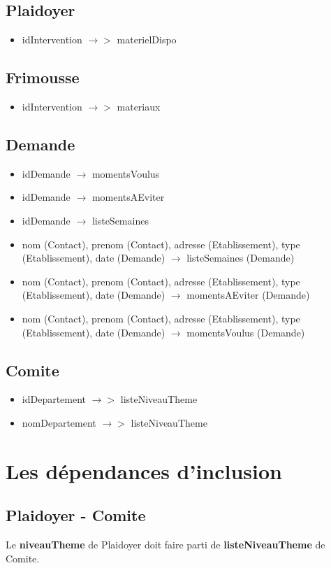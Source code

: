 \documentclass[asi, sansVersion]{picInsa}
\begin{document}
\subsection*{Plaidoyer}
\begin{itemize}
\item[]	idIntervention $\rightarrow >$ materielDispo
\end{itemize}

\subsection*{Frimousse}
\begin{itemize}
\item[]	idIntervention $\rightarrow >$ materiaux
\end{itemize}

\subsection*{Demande}
\begin{itemize}
\item[] idDemande $\rightarrow$ momentsVoulus
\item[] idDemande $\rightarrow$ momentsAEviter
\item[] idDemande $\rightarrow$ listeSemaines
\item[] nom (Contact), prenom (Contact), adresse (Etablissement), type (Etablissement), date (Demande) $\rightarrow$ listeSemaines (Demande) 
\item[] nom (Contact), prenom (Contact), adresse (Etablissement), type (Etablissement), date (Demande) $\rightarrow$ momentsAEviter (Demande) 
\item[] nom (Contact), prenom (Contact), adresse (Etablissement), type (Etablissement), date (Demande) $\rightarrow$ momentsVoulus (Demande) 
\end{itemize}

\subsection*{Comite}
\begin{itemize}
\item[] idDepartement $\rightarrow >$ listeNiveauTheme
\item[] nomDepartement $\rightarrow >$ listeNiveauTheme
\end{itemize}

\section{Les dépendances d'inclusion}

\subsection*{Plaidoyer - Comite}
Le \textbf{niveauTheme} de Plaidoyer doit faire parti de \textbf{listeNiveauTheme} de Comite.
\end{document}
